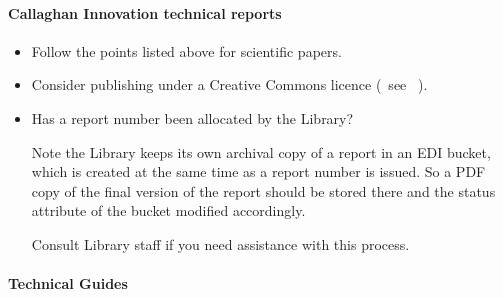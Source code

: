 \paragraph{Callaghan Innovation technical reports}
\begin{itemize}
\item  Follow the points listed above for scientific papers.
\item  Consider publishing under a Creative Commons licence (~see \cite[\S\ref*{GRP-s_copyright}]{MSL_Reporting_Guidelines}~).
\item  Has a report number been allocated by the Library? 

\vspace{\baselineskip}
Note the Library keeps its own archival copy of a report in an EDI bucket, which is created at the same time as a report number is issued. So a PDF copy of the final version of the report should be stored there and the status attribute of the bucket modified accordingly. 

\vspace{\baselineskip}Consult Library staff if you need assistance with this process.
\end{itemize} 

\paragraph{Technical Guides}

